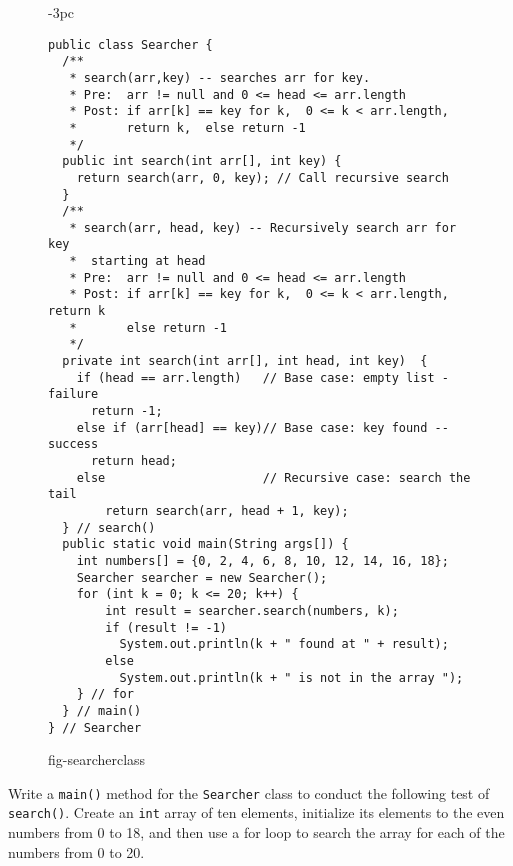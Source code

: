 \begin{figure}[h!]
\jjjprogstart
\begin{jjjlistingleft}[29pc]{-3pc}
\begin{lstlisting}
public class Searcher {
  /**
   * search(arr,key) -- searches arr for key.
   * Pre:  arr != null and 0 <= head <= arr.length
   * Post: if arr[k] == key for k,  0 <= k < arr.length, 
   *       return k,  else return -1
   */
  public int search(int arr[], int key) {
    return search(arr, 0, key); // Call recursive search 
  }
  /**
   * search(arr, head, key) -- Recursively search arr for key
   *  starting at head
   * Pre:  arr != null and 0 <= head <= arr.length
   * Post: if arr[k] == key for k,  0 <= k < arr.length, return k
   *       else return -1
   */
  private int search(int arr[], int head, int key)  {
    if (head == arr.length)   // Base case: empty list - failure
      return -1;
    else if (arr[head] == key)// Base case: key found -- success
      return head;
    else                      // Recursive case: search the tail
        return search(arr, head + 1, key);
  } // search()
  public static void main(String args[]) {
    int numbers[] = {0, 2, 4, 6, 8, 10, 12, 14, 16, 18};
    Searcher searcher = new Searcher();
    for (int k = 0; k <= 20; k++) {
        int result = searcher.search(numbers, k);
        if (result != -1)
          System.out.println(k + " found at " + result);
        else
          System.out.println(k + " is not in the array ");
    } // for
  } // main()
} // Searcher
\end{lstlisting}
\end{jjjlistingleft}
{fig-searcherclass}
\end{figure}


\pagebreak
{}
\label{self-study-exercise}
\begin{SSTUDY}

\item  Write a {\tt main()} method for the {\tt Searcher} class to conduct
the following test of {\tt search()}. Create an {\tt int} array of ten
elements, initialize its elements to the even numbers from 0 to 18,
and then use a for loop to search the array for each of the numbers
from 0 to 20.

\end{SSTUDY}

